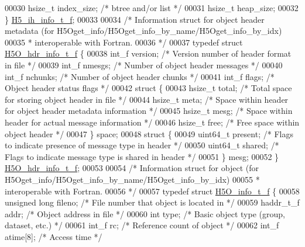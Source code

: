 \begin{DoxyCode}
00030     hsize\_t     index\_size;     \textcolor{comment}{/* btree and/or list */}
00031     hsize\_t     heap\_size;
00032 \} \hyperlink{struct_h5__ih__info__t__f}{H5\_ih\_info\_t\_f};
00033 
00034 \textcolor{comment}{/* Information struct for object header metadata (for H5Oget\_info/H5Oget\_info\_by\_name/H5Oget\_info\_by\_idx) }
00035 \textcolor{comment}{ *  interoperable with Fortran.}
00036 \textcolor{comment}{ */}
00037 \textcolor{keyword}{typedef} \textcolor{keyword}{struct }\hyperlink{struct_h5_o__hdr__info__t__f}{H5O\_hdr\_info\_t\_f} \{
00038     int\_f version;      \textcolor{comment}{/* Version number of header format in file */}
00039     int\_f nmesgs;       \textcolor{comment}{/* Number of object header messages */}
00040     int\_f nchunks;      \textcolor{comment}{/* Number of object header chunks */}
00041     int\_f flags;                \textcolor{comment}{/* Object header status flags */}
00042     \textcolor{keyword}{struct }\{
00043         hsize\_t total;      \textcolor{comment}{/* Total space for storing object header in file */}
00044         hsize\_t meta;       \textcolor{comment}{/* Space within header for object header metadata information */}
00045         hsize\_t mesg;       \textcolor{comment}{/* Space within header for actual message information */}
00046         hsize\_t free;       \textcolor{comment}{/* Free space within object header */}
00047     \} space;
00048     \textcolor{keyword}{struct }\{
00049         uint64\_t present;   \textcolor{comment}{/* Flags to indicate presence of message type in header */}
00050         uint64\_t shared;    \textcolor{comment}{/* Flags to indicate message type is shared in header */}
00051     \} mesg;
00052 \} \hyperlink{struct_h5_o__hdr__info__t__f}{H5O\_hdr\_info\_t\_f};
00053 
00054 \textcolor{comment}{/* Information struct for object (for H5Oget\_info/H5Oget\_info\_by\_name/H5Oget\_info\_by\_idx) }
00055 \textcolor{comment}{ *  interoperable with Fortran.}
00056 \textcolor{comment}{ */}
00057 \textcolor{keyword}{typedef} \textcolor{keyword}{struct }\hyperlink{struct_h5_o__info__t__f}{H5O\_info\_t\_f} \{
00058     \textcolor{keywordtype}{unsigned} \textcolor{keywordtype}{long}   fileno;     \textcolor{comment}{/* File number that object is located in */}
00059     haddr\_t\_f       addr;       \textcolor{comment}{/* Object address in file   */}
00060     \textcolor{keywordtype}{int}         type;       \textcolor{comment}{/* Basic object type (group, dataset, etc.) */}
00061     int\_f       rc;     \textcolor{comment}{/* Reference count of object    */}
00062     int\_f           atime[8];   \textcolor{comment}{/* Access time          */}

\end{DoxyCode}
